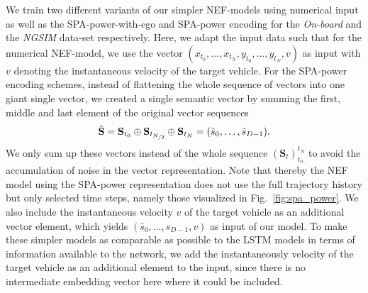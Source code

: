 We train two different variants of our simpler \ac{NEF}-models using numerical input as well as the \ac{SPA}-power-with-ego and \ac{SPA}-power encoding for the \emph{On-board} and the \emph{\ac{NGSIM}} data-set respectively.
Here, we adapt the input data such that for the numerical \ac{NEF}-model, we use the vector $(x_{t_{0}}, \ldots, x_{t_{N}}, y_{t_{0}}, \ldots, y_{t_{N}}, v)$ as input with $v$ denoting the instantaneous velocity of the target vehicle.
For the \ac{SPA}-power encoding schemes, instead of flattening the whole sequence of vectors into one giant single vector, we created a single semantic vector by summing the first, middle and last element of the original vector sequences
\begin{equation}
  \hat{\mathbf{S}} =  \mathbf{S}_{t_0} \oplus \mathbf{S}_{t_{\nicefrac{N}{2}}} \oplus \mathbf{S}_{t_N} = (\hat{s}_0, \ldots, \hat{s}_{D-1}).
\end{equation}
We only sum up these vectors instead of the whole sequence $(\mathbf{S}_{t})_{t_0}^{t_N}$ to avoid the accumulation of noise in the vector representation.
Note that thereby the \ac{NEF} model using the \ac{SPA}-power representation does not use the full trajectory history but only selected time steps, namely those visualized in Fig.~\ref{fig:spa_power}.
We also include the instantaneous velocity $v$ of the target vehicle as an additional vector element, which yields $(\hat{s}_0, \ldots, \hat{s}_{D-1}, v)$ as input of our model.
To make these simpler models as comparable as possible to the \ac{LSTM} models in terms of information available to the network, we add the instantaneously velocity of the target vehicle as an additional element to the input, since there is no intermediate embedding vector here where it could be included.

